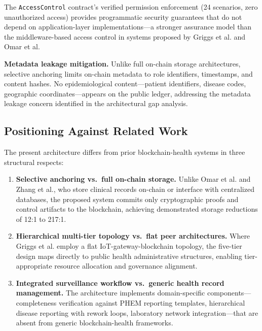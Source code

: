 \documentclass[AMA,LATO1COL]{WileyNJD-v2}
\begin{document}
The \texttt{AccessControl} contract's verified permission enforcement (24 scenarios, zero unauthorized access) provides programmatic security guarantees that do not depend on application-layer implementations---a stronger assurance model than the middleware-based access control in systems proposed by Griggs et al.\cite{griggs2018healthcare} and Omar et al.\cite{omar2019privacy}

\textbf{Metadata leakage mitigation.} Unlike full on-chain storage architectures, selective anchoring limits on-chain metadata to role identifiers, timestamps, and content hashes. No epidemiological content---patient identifiers, disease codes, geographic coordinates---appears on the public ledger, addressing the metadata leakage concern identified in the architectural gap analysis.

\subsection{Positioning Against Related Work}\label{subsec:disc_positioning}

The present architecture differs from prior blockchain-health systems in three structural respects:

\begin{enumerate}
\item \textbf{Selective anchoring vs.\ full on-chain storage.} Unlike Omar et al.\cite{omar2019privacy} and Zhang et al.,\cite{zhang2018fhirchain} who store clinical records on-chain or interface with centralized databases, the proposed system commits only cryptographic proofs and control artifacts to the blockchain, achieving demonstrated storage reductions of 12:1 to 217:1.

\item \textbf{Hierarchical multi-tier topology vs.\ flat peer architectures.} Where Griggs et al.\cite{griggs2018healthcare} employ a flat IoT-gateway-blockchain topology, the five-tier design maps directly to public health administrative structures, enabling tier-appropriate resource allocation and governance alignment.

\item \textbf{Integrated surveillance workflow vs.\ generic health record management.} The architecture implements domain-specific components---completeness verification against PHEM reporting templates, hierarchical disease reporting with rework loops, laboratory network integration---that are absent from generic blockchain-health frameworks.
\end{enumerate}
\end{document}
